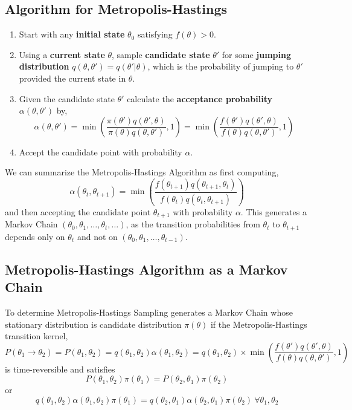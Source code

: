 \subsection{Algorithm for Metropolis-Hastings}
\begin{enumerate}
	\item Start with any \textbf{initial state}  $ \theta_0 $ satisfying $ f(\theta) > 0 $.
	\item Using a \textbf{current state}  $ \theta $, sample \textbf{candidate state} $ \theta' $ for some \textbf{jumping distribution} $ q(\theta, \theta') = q(\theta'|\theta) $, which is the probability of jumping to $ \theta' $ provided the current state in $ \theta $.
	\item Given the candidate state $ \theta' $ calculate the \textbf{acceptance probability} $ \alpha(\theta,\theta') $ by,
	      \[
		      \alpha(\theta,\theta') =\min\left( \frac{\pi(\theta')q(\theta', \theta)}{\pi(\theta)q(\theta, \theta')}, 1\right) = \min\left( \frac{f(\theta')q(\theta', \theta)}{f(\theta)q(\theta, \theta')} , 1\right)
	      \]
	\item  Accept the candidate point with probability $ \alpha $.

\end{enumerate}
We can summarize the Metropolis-Hastings Algorithm as first computing,
\[
	\alpha(\theta_{t},\theta_{t+1}) = \min \left( \frac{f(\theta_{t+1})q(\theta_{t+1},\theta_t)}{ f(\theta_t) q(\theta_t,\theta_{t+1}) } \right)
\]
and then accepting the candidate point $ \theta_{t+1} $ with probability $ \alpha $. This generates a Markov Chain $ ( \theta_0,\theta_1,\ldots,\theta_t,\ldots ) $,
as the transition probabilities from $ \theta_t $ to $ \theta_{t+1} $ depends only on $ \theta_t $ and not on $ (\theta_0,\theta_1,\ldots,\theta_{t-1}) $.

\subsection{Metropolis-Hastings Algorithm as a Markov Chain}
To determine Metropolis-Hastings Sampling generates a Markov Chain whose stationary distribution is candidate distribution $ \pi(\theta) $ if the Metropolis-Hastings transition kernel,
\begin{equation}
	\label{transition-kernel}
	P(\theta_1\to \theta_2) = P(\theta_1,\theta_2) = q(\theta_1,\theta_2)\alpha(\theta_1,\theta_2) = q(\theta_1,\theta_2)\times \min\left( \frac{f(\theta')q(\theta', \theta)}{f(\theta)q(\theta, \theta')} , 1\right)
\end{equation}
is time-reversible and satisfies
\[
	P(\theta_1, \theta_2) \pi(\theta_1) = P(\theta_2, \theta_1) \pi(\theta_2)
\]
or
\begin{equation}
	\label{balance-equatation}
	q(\theta_1,\theta_2)\alpha(\theta_1,\theta_2)\pi(\theta_1) = q(\theta_2,\theta_1)\alpha(\theta_2,\theta_1)\pi(\theta_2) \ \forall \theta_1, \theta_2
\end{equation}

